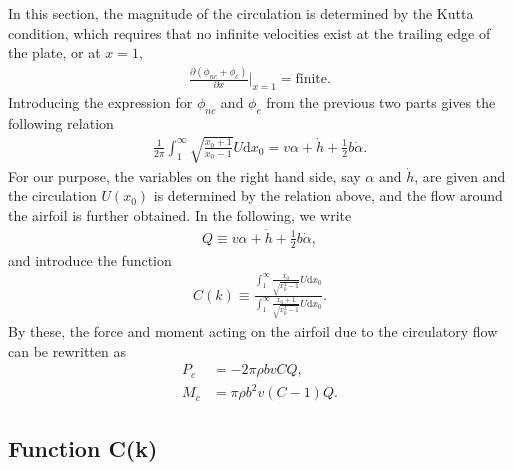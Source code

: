 In this section, the magnitude of the circulation is determined by the Kutta condition, which requires that no infinite velocities exist at the trailing edge of the plate, or at $x = 1$,
\begin{align}
\frac{\partial (\phi_{nc} + \phi_c)}{\partial x} |_{x = 1} = \text{finite}.
\end{align}
Introducing the expression for $\phi_{nc}$ and $\phi_c$ from the previous two parts gives the following relation
\begin{align}       \label{eqn:Kutta}
\frac{1}{2\pi} \int_{1}^{\infty} \sqrt{\frac{x_0+1}{x_0-1}} U \mathrm{d}x_0 = v\alpha + \dot{h} + \frac{1}{2}b\dot{\alpha}.
\end{align}
For our purpose, the variables on the right hand side, say $\alpha$ and $\dot{h}$, are given and the circulation $U(x_0)$ is determined by the relation above, and the flow around the airfoil is further obtained. 
In the following, we write
\begin{align}
Q \equiv v\alpha + \dot{h} + \frac{1}{2}b\dot{\alpha},
\end{align}
and introduce the function
\begin{align}
C(k) \equiv \frac{\int_{1}^{\infty} \frac{x_0}{\sqrt{x_0^2-1}} U \mathrm{d}x_0}{\int_{1}^{\infty} \frac{x_0+1}{\sqrt{x_0^2-1}} U \mathrm{d}x_0}.
\end{align}
By these, the force and moment acting on the airfoil due to the circulatory flow can be rewritten as
\begin{align}
P_c & = -2\pi \rho b v CQ,  \\
M_c & = \pi \rho b^2 v (C-1)Q.
\end{align}

\subsection{Function C(k)}

